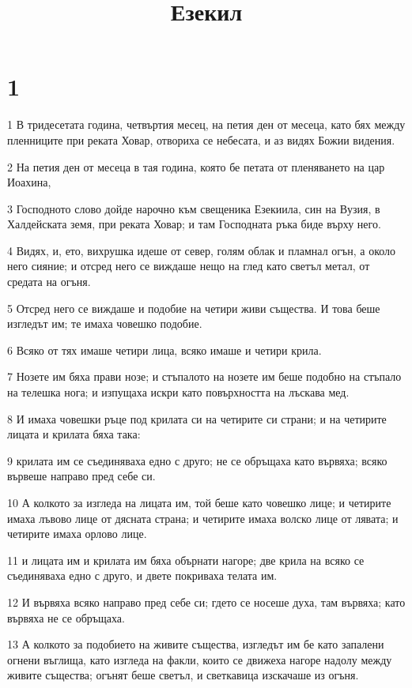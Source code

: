 

\title{Езекил}


\chapter{1}

\par 1 В тридесетата година, четвъртия месец, на петия ден от месеца, като бях между пленниците при реката Ховар, отвориха се небесата, и аз видях Божии видения.
\par 2 На петия ден от месеца в тая година, която бе петата от пленяването на цар Иоахина,
\par 3 Господното слово дойде нарочно към свещеника Езекиила, син на Вузия, в Халдейската земя, при реката Ховар; и там Господната ръка биде върху него.
\par 4 Видях, и, ето, вихрушка идеше от север, голям облак и пламнал огън, а около него сияние; и отсред него се виждаше нещо на глед като светъл метал, от средата на огъня.
\par 5 Отсред него се виждаше и подобие на четири живи същества. И това беше изгледът им; те имаха човешко подобие.
\par 6 Всяко от тях имаше четири лица, всяко имаше и четири крила.
\par 7 Нозете им бяха прави нозе; и стъпалото на нозете им беше подобно на стъпало на телешка нога; и изпущаха искри като повърхността на лъскава мед.
\par 8 И имаха човешки ръце под крилата си на четирите си страни; и на четирите лицата и крилата бяха така:
\par 9 крилата им се съединяваха едно с друго; не се обръщаха като вървяха; всяко вървеше направо пред себе си.
\par 10 А колкото за изгледа на лицата им, той беше като човешко лице; и четирите имаха лъвово лице от дясната страна; и четирите имаха волско лице от лявата; и четирите имаха орлово лице.
\par 11 и лицата им и крилата им бяха обърнати нагоре; две крила на всяко се съединяваха едно с друго, и двете покриваха телата им.
\par 12 И вървяха всяко направо пред себе си; гдето се носеше духа, там вървяха; като вървяха не се обръщаха.
\par 13 А колкото за подобието на живите същества, изгледът им бе като запалени огнени въглища, като изгледа на факли, които се движеха нагоре надолу между живите същества; огънят беше светъл, и светкавица изскачаше из огъня.
